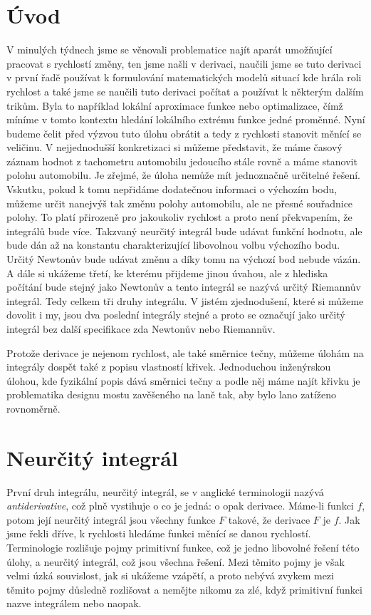 \documentclass[12pt]{article}
\begin{document}
\section*{Úvod}

V minulých týdnech jsme se věnovali problematice najít aparát umožňující pracovat s rychlostí změny, ten jsme našli v derivaci, naučili jsme se tuto derivaci v první řadě používat k formulování matematických modelů situací kde hrála roli rychlost a také jsme se naučili tuto derivaci počítat a používat k některým dalším trikům. Byla to například lokální aproximace funkce nebo optimalizace, čímž míníme v tomto kontextu hledání lokálního extrému funkce jedné proměnné. Nyní budeme čelit před výzvou tuto úlohu obrátit a tedy z rychlosti stanovit měnící se veličinu. V nejjednodušší konkretizaci si můžeme představit, že máme časový záznam hodnot z tachometru automobilu jedoucího stále rovně a máme stanovit polohu automobilu. Je zřejmé, že úloha nemůže mít jednoznačně určitelné řešení. Vskutku, pokud k tomu nepřidáme dodatečnou informaci o výchozím bodu, můžeme určit nanejvýš tak změnu polohy automobilu, ale ne přesné souřadnice polohy. To platí přirozeně pro jakoukoliv rychlost a proto není překvapením, že integrálů bude více. Takzvaný neurčitý integrál bude udávat funkční hodnotu, ale bude dán až na konstantu charakterizující libovolnou volbu výchozího bodu. Určitý Newtonův bude udávat změnu a díky tomu na výchozí bod nebude vázán. A dále si ukážeme třetí, ke kterému přijdeme jinou úvahou, ale z hlediska počítání bude stejný jako Newtonův a tento integrál se nazývá určitý Riemannův integrál. Tedy celkem tři druhy integrálu. V jistém zjednodušení, které si můžeme dovolit i my, jsou dva poslední integrály stejné a proto se označují jako určitý integrál bez další specifikace zda Newtonův nebo Riemannův.

Protože derivace je nejenom rychlost, ale také směrnice tečny, můžeme  úlohám na integrály dospět také z popisu vlastností křivek. Jednoduchou inženýrskou úlohou, kde fyzikální popis dává směrnici tečny a podle něj máme najít křivku je problematika designu mostu zavěšeného na laně tak, aby bylo lano zatíženo rovnoměrně.


\section*{Neurčitý integrál}

První druh integrálu, neurčitý integrál, se v anglické terminologii nazývá \textit{antiderivative}, což plně vystihuje o co je jedná: o opak derivace. Máme-li funkci $f$, potom její neurčitý integrál jsou všechny funkce $F$ takové, že derivace $F$ je $f$. Jak jsme řekli dříve, k rychlosti hledáme funkci měnící se danou rychlostí. Terminologie rozlišuje pojmy primitivní funkce, což je jedno libovolné řešení této úlohy, a neurčitý integrál, což jsou všechna řešení. Mezi těmito pojmy je však velmi úzká souvislost, jak si ukážeme vzápětí, a proto nebývá zvykem mezi těmito pojmy důsledně rozlišovat a nemějte nikomu za zlé, když primitivní funkci nazve integrálem nebo naopak. 
\end{document}
